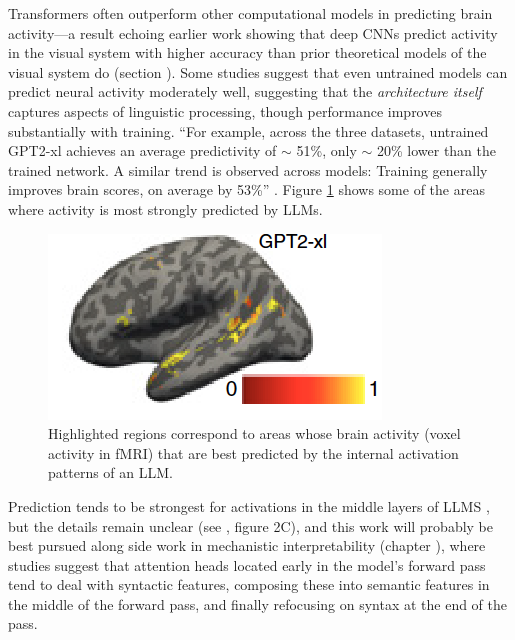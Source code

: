 Transformers often outperform other computational models in predicting brain
activity---a result echoing earlier work showing that deep CNNs predict
activity in the visual system with higher accuracy than prior theoretical
models of the visual system do (section ). Some
studies suggest that even untrained models can predict neural activity
moderately well, suggesting that the \emph{architecture itself} captures
aspects of linguistic processing, though performance improves substantially
with training. ``For example, across the three datasets, untrained GPT2-xl
achieves an average predictivity of $\sim$ 51\%, only $\sim$ 20\% lower than
the trained network. A similar trend is observed across models: Training
generally improves brain scores, on average by 53\%''
\cite{schrimpf2021neural}. Figure \ref{brainPredictionLLM} shows some of the
areas where activity is most strongly predicted by LLMs.

\begin{figure}[ht]
\centering
\includegraphics[scale=.9]{./images/brainPredictionsLLM.png}
\caption[From \cite{schrimpf2021neural}.]{Highlighted regions correspond to
areas whose brain activity (voxel activity in fMRI) that are best predicted by
the internal activation patterns of an LLM.
}
\label{brainPredictionLLM}
\end{figure}

Prediction tends to be strongest for activations in the middle layers of LLMS
\cite{caucheteux2022brains}, but the details remain unclear (see
\cite{schrimpf2021neural}, figure 2C), and this work will probably be best
pursued along side work in mechanistic interpretability  (chapter
), where studies suggest that attention heads located
early in the model's forward pass tend to deal with syntactic features,
composing these into semantic features in the middle of the forward pass, and
finally refocusing on syntax at the end of the pass.


